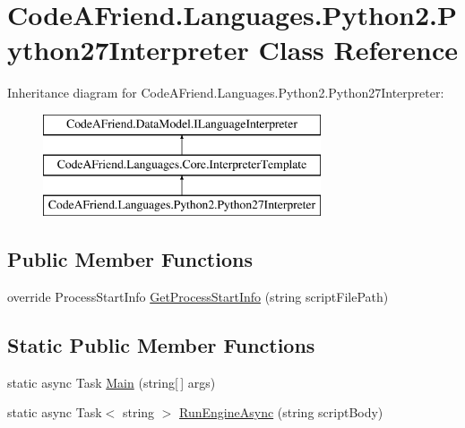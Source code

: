 \hypertarget{class_code_a_friend_1_1_languages_1_1_python2_1_1_python27_interpreter}{}\section{Code\+A\+Friend.\+Languages.\+Python2.\+Python27\+Interpreter Class Reference}
\label{class_code_a_friend_1_1_languages_1_1_python2_1_1_python27_interpreter}


 


Inheritance diagram for Code\+A\+Friend.\+Languages.\+Python2.\+Python27\+Interpreter\+:\begin{figure}[H]
\begin{center}
\leavevmode
\includegraphics[height=3.000000cm]{class_code_a_friend_1_1_languages_1_1_python2_1_1_python27_interpreter}
\end{center}
\end{figure}
\subsection*{Public Member Functions}
\begin{DoxyCompactItemize}
\item 
override Process\+Start\+Info \mbox{\hyperlink{class_code_a_friend_1_1_languages_1_1_python2_1_1_python27_interpreter_a24b4f1f296ab282b0fcac3951af0a73b}{Get\+Process\+Start\+Info}} (string script\+File\+Path)
\end{DoxyCompactItemize}
\subsection*{Static Public Member Functions}
\begin{DoxyCompactItemize}
\item 
static async Task \mbox{\hyperlink{class_code_a_friend_1_1_languages_1_1_python2_1_1_python27_interpreter_a81b2649dd7c6a7dc934efbd27e14377b}{Main}} (string\mbox{[}$\,$\mbox{]} args)
\item 
static async Task$<$ string $>$ \mbox{\hyperlink{class_code_a_friend_1_1_languages_1_1_python2_1_1_python27_interpreter_ad72980fe0c53ba1da906f2e5c5b04c19}{Run\+Engine\+Async}} (string script\+Body)
\end{DoxyCompactItemize}
